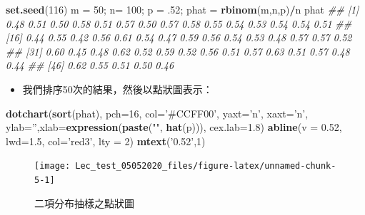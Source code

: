 \documentclass[hyperref,]{ctexart}
\newenvironment{Shaded}{\begin{snugshade}}{\end{snugshade}}
\newcommand{\CommentTok}[1]{\textcolor[rgb]{0.56,0.35,0.01}{\textit{#1}}}
\newcommand{\DataTypeTok}[1]{\textcolor[rgb]{0.13,0.29,0.53}{#1}}
\newcommand{\DecValTok}[1]{\textcolor[rgb]{0.00,0.00,0.81}{#1}}
\newcommand{\FloatTok}[1]{\textcolor[rgb]{0.00,0.00,0.81}{#1}}
\newcommand{\KeywordTok}[1]{\textcolor[rgb]{0.13,0.29,0.53}{\textbf{#1}}}
\newcommand{\NormalTok}[1]{#1}
\newcommand{\OperatorTok}[1]{\textcolor[rgb]{0.81,0.36,0.00}{\textbf{#1}}}
\newcommand{\StringTok}[1]{\textcolor[rgb]{0.31,0.60,0.02}{#1}}
\providecommand{\tightlist}{%
  \setlength{\itemsep}{0pt}\setlength{\parskip}{0pt}}
\begin{document}
\begin{Shaded}
\begin{Highlighting}[]
\KeywordTok{set.seed}\NormalTok{(}\DecValTok{116}\NormalTok{)}
\NormalTok{m =}\StringTok{ }\DecValTok{50}\NormalTok{; n=}\StringTok{ }\DecValTok{100}\NormalTok{; p =}\StringTok{ }\FloatTok{.52}\NormalTok{;}
\NormalTok{phat =}\StringTok{ }\KeywordTok{rbinom}\NormalTok{(m,n,p)}\OperatorTok{/}\NormalTok{n}
\NormalTok{phat}
\CommentTok{##  [1] 0.48 0.51 0.50 0.58 0.51 0.57 0.50 0.57 0.58 0.55 0.54 0.53 0.54 0.54 0.51}
\CommentTok{## [16] 0.44 0.55 0.42 0.56 0.61 0.54 0.47 0.59 0.56 0.54 0.53 0.48 0.57 0.57 0.52}
\CommentTok{## [31] 0.60 0.45 0.48 0.62 0.52 0.59 0.52 0.56 0.51 0.57 0.63 0.51 0.57 0.48 0.44}
\CommentTok{## [46] 0.62 0.55 0.51 0.50 0.46}
\end{Highlighting}
\end{Shaded}

\begin{itemize}
\tightlist
\item
  我們排序50次的結果，然後以點狀圖表示：
\end{itemize}

\begin{Shaded}
\begin{Highlighting}[]
\KeywordTok{dotchart}\NormalTok{(}\KeywordTok{sort}\NormalTok{(phat), }\DataTypeTok{pch=}\DecValTok{16}\NormalTok{, }\DataTypeTok{col=}\StringTok{'#CCFF00'}\NormalTok{, }\DataTypeTok{yaxt=}\StringTok{'n'}\NormalTok{, }\DataTypeTok{xaxt=}\StringTok{'n'}\NormalTok{,   }
  \DataTypeTok{ylab=}\StringTok{''}\NormalTok{,}\DataTypeTok{xlab=}\KeywordTok{expression}\NormalTok{(}\KeywordTok{paste}\NormalTok{(}\StringTok{""}\NormalTok{, }\KeywordTok{hat}\NormalTok{(p))), }\DataTypeTok{cex.lab=}\FloatTok{1.8}\NormalTok{)}
\KeywordTok{abline}\NormalTok{(}\DataTypeTok{v =} \FloatTok{0.52}\NormalTok{, }\DataTypeTok{lwd=}\FloatTok{1.5}\NormalTok{, }\DataTypeTok{col=}\StringTok{'red3'}\NormalTok{, }\DataTypeTok{lty =} \DecValTok{2}\NormalTok{)}
\KeywordTok{mtext}\NormalTok{(}\StringTok{'0.52'}\NormalTok{,}\DecValTok{1}\NormalTok{)}
\end{Highlighting}
\end{Shaded}

\begin{figure}

\texttt{[image: Lec\_test\_05052020\_files/figure-latex/unnamed-chunk-5-1]} \hfill{}

\caption{\label{fig:dotchart1}二項分布抽樣之點狀圖}\label{fig:unnamed-chunk-5}
\end{figure}
\end{document}

